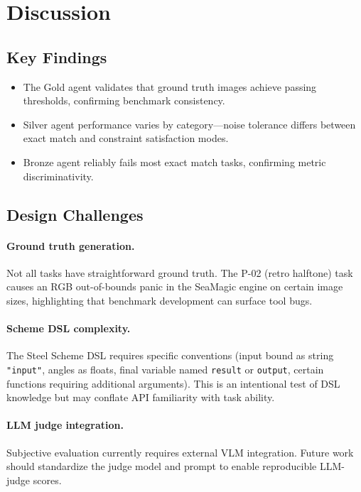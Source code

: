 \documentclass[11pt,a4paper]{article}
\begin{document}
\section{Discussion}

\subsection{Key Findings}

\begin{itemize}
    \item The Gold agent validates that ground truth images achieve passing thresholds, confirming benchmark consistency.
    \item Silver agent performance varies by category---noise tolerance differs between exact match and constraint satisfaction modes.
    \item Bronze agent reliably fails most exact match tasks, confirming metric discriminativity.
\end{itemize}

\subsection{Design Challenges}

\paragraph{Ground truth generation.} Not all tasks have straightforward ground truth. The P-02 (retro halftone) task causes an RGB out-of-bounds panic in the SeaMagic engine on certain image sizes, highlighting that benchmark development can surface tool bugs.

\paragraph{Scheme DSL complexity.} The Steel Scheme DSL requires specific conventions (input bound as string \texttt{"input"}, angles as floats, final variable named \texttt{result} or \texttt{output}, certain functions requiring additional arguments). This is an intentional test of DSL knowledge but may conflate API familiarity with task ability.

\paragraph{LLM judge integration.} Subjective evaluation currently requires external VLM integration. Future work should standardize the judge model and prompt to enable reproducible LLM-judge scores.
\end{document}
